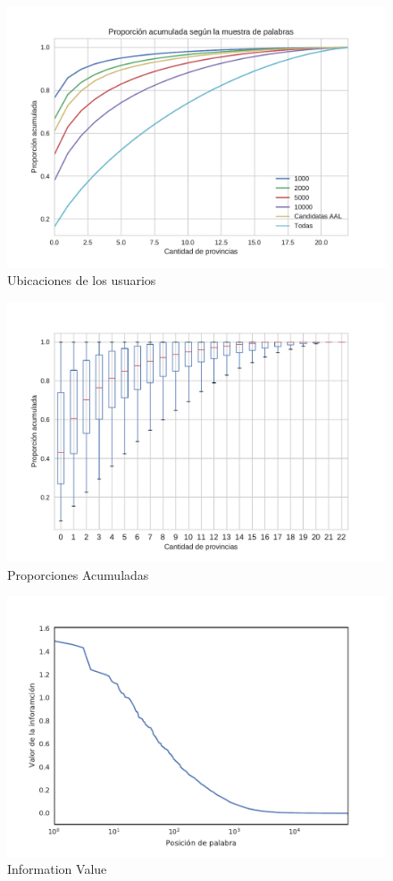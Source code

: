 

\begin{figure}[ht]
\centering
\includegraphics[scale=0.6]{./images/PropAcum.pdf}
\caption{Ubicaciones de los usuarios} 
\label{fig:propAcum} 
\end{figure}

\begin{figure}[ht]
\centering
\includegraphics[scale=0.6]{./images/PropAcum5000.pdf}
\caption{Proporciones Acumuladas} 
\label{fig:propAcum5000} 
\end{figure}

\begin{figure}[ht]
\centering
\includegraphics[scale=0.6]{./images/ivaluesLog.pdf}
\caption{Information Value} 
\label{fig:ivalue} 
\end{figure}
